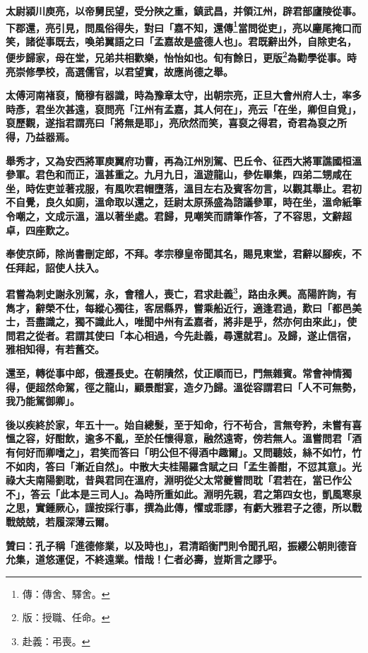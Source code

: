 \textbf{太尉潁川庾亮，以帝舅民望，受分陜之重，鎮武昌，并領江州，辟君部廬陵從事。下郡還，亮引見，問風俗得失，對曰「嘉不知，還傳\footnote{傳：傳舍、驛舍。}當問從吏」，亮以麈尾掩口而笑，諸從事既去，喚弟翼語之曰「孟嘉故是盛德人也」。君既辭出外，自除吏名，便步歸家，母在堂，兄弟共相歡樂，怡怡如也。旬有餘日，更版\footnote{版：授職、任命。}為勸學從事。時亮崇修學校，高選儒官，以君望實，故應尚德之舉。}

\textbf{太傅河南褚裒，簡穆有器識，時為豫章太守，出朝宗亮，正旦大會州府人士，率多時彥，君坐次甚遠，裒問亮「江州有孟嘉，其人何在」，亮云「在坐，卿但自覓」，裒歷觀，遂指君謂亮曰「將無是耶」，亮欣然而笑，喜裒之得君，奇君為裒之所得，乃益器焉。}

\textbf{舉秀才，又為安西將軍庾翼府功曹，再為江州別駕、巴丘令、征西大將軍譙國桓溫參軍。君色和而正，溫甚重之。九月九日，溫遊龍山，參佐畢集，四弟二甥咸在坐，時佐吏並著戎服，有風吹君帽墮落，溫目左右及賓客勿言，以觀其舉止。君初不自覺，良久如廁，溫命取以還之，廷尉太原孫盛為諮議參軍，時在坐，溫命紙筆令嘲之，文成示溫，溫以著坐處。君歸，見嘲笑而請筆作答，了不容思，文辭超卓，四座歎之。}

\textbf{奉使京師，除尚書刪定郎，不拜。孝宗穆皇帝聞其名，賜見東堂，君辭以腳疾，不任拜起，詔使人扶入。}

\textbf{君嘗為刺史謝永別駕，永，會稽人，喪亡，君求赴義\footnote{赴義：弔喪。}，路由永興。高陽許詢，有雋才，辭榮不仕，每縱心獨往，客居縣界，嘗乘船近行，適逢君過，歎曰「都邑美士，吾盡識之，獨不識此人，唯聞中州有孟嘉者，將非是乎，然亦何由來此」，使問君之從者。君謂其使曰「本心相過，今先赴義，尋還就君」。及歸，遂止信宿，雅相知得，有若舊交。}

\textbf{還至，轉從事中郎，俄遷長史。在朝隤然，仗正順而已，門無雜賓。常會神情獨得，便超然命駕，徑之龍山，顧景酣宴，造夕乃歸。溫從容謂君曰「人不可無勢，我乃能駕御卿」。}

\textbf{後以疾終於家，年五十一。始自總髮，至于知命，行不茍合，言無夸矜，未嘗有喜慍之容，好酣飲，逾多不亂，至於任懷得意，融然遠寄，傍若無人。溫嘗問君「酒有何好而卿嗜之」，君笑而答曰「明公但不得酒中趣爾」。又問聽妓，絲不如竹，竹不如肉，答曰「漸近自然」。中散大夫桂陽羅含賦之曰「孟生善酣，不愆其意」。光祿大夫南陽劉耽，昔與君同在溫府，淵明從父太常夔嘗問耽「君若在，當已作公不」，答云「此本是三司人」。為時所重如此。淵明先親，君之第四女也，凱風寒泉之思，實鍾厥心，謹按採行事，撰為此傳，懼或乖謬，有虧大雅君子之德，所以戰戰兢兢，若履深薄云爾。}

\textbf{贊曰：孔子稱「進德修業，以及時也」，君清蹈衡門則令聞孔昭，振纓公朝則德音允集，道悠運促，不終遠業。惜哉！仁者必壽，豈斯言之謬乎。}

